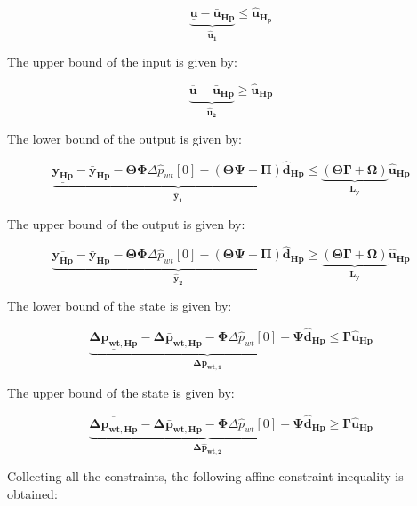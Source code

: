 \begin{equation}
\underbrace{\underline{\bm{{u}}} - \bm{\bar{u}_{Hp}}}_{\bm{\hat{u}_{1}}} \leq \bm{\hat{u}_{H_p}}
\end{equation}


The upper bound of the input is given by:

\begin{equation}
	\underbrace{\overline{\bm{{u}}} - \bm{\bar{u}_{Hp}}}_{\bm{\hat{u}_{2}}} \geq \bm{\hat{u}_{Hp}}
\end{equation}

The lower bound of the output is given by:

\begin{equation}
\underbrace{\underline{\bm{y_{Hp}}} - \bm{\bar{y}_{Hp}} - \bm{\Theta} \bm{\Phi} \Delta \hat{p}_{wt}[0] - (\bm{\Theta \Psi + \Pi}) \bm{\hat{d}_{Hp}}}_{\bm{\hat{y}_1}} \leq \underbrace{(\bm{\Theta \Gamma + \Omega})}_{\bm{L_y}} \bm{\hat{u}_{Hp}}
\end{equation}

The upper bound of the output is given by:

\begin{equation}
\underbrace{\overline{\bm{y_{Hp}}} - \bm{\bar{y}_{Hp}} - \bm{\Theta} \bm{\Phi} \Delta \hat{p}_{wt}[0] - (\bm{\Theta \Psi + \Pi}) \bm{\hat{d}_{Hp}}}_{\bm{\hat{y}_2}} \geq \underbrace{(\bm{\Theta \Gamma + \Omega})}_{\bm{L_y}} \bm{\hat{u}_{Hp}}
\end{equation}

The lower bound of the state is given by:

\begin{equation}
\underbrace{\underline{\bm{\Delta p_{wt,Hp}}} - \bm{\Delta \bar{p}_{wt,Hp}} -  \bm{\Phi} \Delta \hat{p}_{wt}[0] - \bm{\Psi} \bm{\hat{d}_{Hp}}}_{\bm{\Delta \hat{p}_{wt,1}}} \leq \bm{\Gamma} \bm{\hat{u}_{Hp}}
\end{equation}

The upper bound of the state is given by:

\begin{equation}
\underbrace{\overline{\bm{\Delta p_{wt,Hp}}} - \bm{\Delta \bar{p}_{wt,Hp}} -  \bm{\Phi} \Delta \hat{p}_{wt}[0] - \bm{\Psi} \bm{\hat{d}_{Hp}}}_{\bm{\Delta \hat{p}_{wt,2}}} \geq \bm{\Gamma} \bm{\hat{u}_{Hp}}
\end{equation}

Collecting all the constraints, the following affine constraint inequality is obtained:

